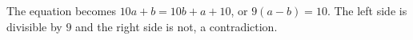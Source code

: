 The equation becomes $10a+b=10b+a+10$, or $9(a-b)=10$. The left side is divisible by $9$ and the right side is not, a contradiction.
